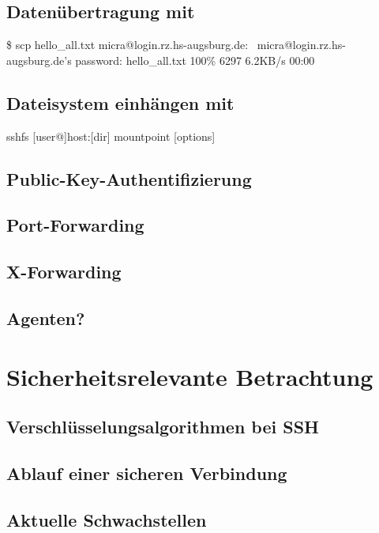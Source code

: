 \documentclass[ngerman,pdf]{wkcms}    %
\begin{document}
\subsection{Datenübertragung mit }

\begin{program}
\$ scp hello\_all.txt
micra@login.rz.hs-augsburg.de:~
micra@login.rz.hs-augsburg.de's password:
hello\_all.txt        100\% 6297     6.2KB/s   00:00
\end{program}

\subsection{Dateisystem einhängen mit }

\begin{program}
sshfs [user@]host:[dir] mountpoint [options]
\end{program}

\subsection{Public-Key-Authentifizierung}
\subsection{Port-Forwarding}
\subsection{X-Forwarding}
\subsection{Agenten?}


\section{Sicherheitsrelevante Betrachtung}
\subsection{Verschlüsselungsalgorithmen bei SSH}
\subsection{Ablauf einer sicheren Verbindung}
\subsection{Aktuelle Schwachstellen}
\end{document}
